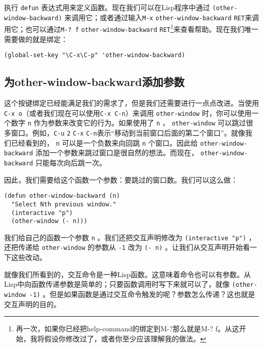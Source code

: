 执行 \texttt{defun} 表达式用来定义函数。现在我们可以在Lisp程序中通过 \texttt{(other-window-backward)} 来调用它；或者通过输入\verb|M-x| \texttt{other-window-backward} \verb|RET|来调用它；也可以通过\verb|M-? f| \texttt{other-window-backward} \verb|RET|\footnote{再一次，如果你已经把help-command的绑定到M-?那么就是M-? f。从这开始，我将假设你修改过了，或者你至少应该理解我的做法。}来查看帮助。现在我们唯一需要做的就是绑定：

\begin{verbatim}
(global-set-key "\C-x\C-p" 'other-window-backward)
\end{verbatim}

\subsection{为other-window-backward添加参数}
\label{section:02-Parameterizing-other-window-backward}

这个按键绑定已经能满足我们的需求了，但是我们还需要进行一点点改进。当使用\verb|C-x o|（或者我们现在可以使用\verb|C-x C-n|）来调用 \texttt{other-window} 时，你可以使用一个数字 \texttt{n} 作为参数来改变它的行为。如果使用了 \texttt{n} ， \texttt{other-window} 可以跳过很多窗口。例如，\verb|C-u| \verb|2| \verb|C-x| \verb|C-n|表示“移动到当前窗口后面的第二个窗口”。就像我们已经看到的， \texttt{n} 可以是一个负数来向回跳 \texttt{n} 个窗口。因此给 \texttt{other-window-backward} 添加一个参数来跳过窗口是很自然的想法。而现在， \texttt{other-window-backward} 只能每次向后跳一次。

因此，我们需要给这个函数一个参数：要跳过的窗口数。我们可以这么做：

\begin{verbatim}
(defun other-window-backward (n)
  "Select Nth previous window."
  (interactive "p")
  (other-window (- n)))
\end{verbatim}

我们给自己的函数一个参数 \texttt{n} 。我们还把交互声明修改为 \texttt{(interactive "p")} ，还把传递给 \texttt{other-window} 的参数从 \texttt{-1} 改为 \texttt{(- n)} 。让我们从交互声明开始看一下这些改动。

就像我们所看到的，交互命令是一种Lisp函数。这意味着命令也可以有参数。从Lisp中向函数传递参数是简单的；只要函数调用时写下来就可以了，就像 \texttt{(other-window -1)} 。但是如果函数是通过交互命令触发的呢？参数怎么传递？这也就是交互声明的目的。


